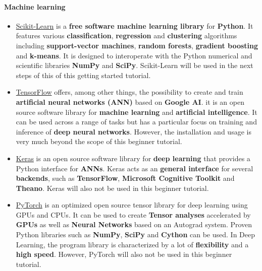 \documentclass [oneside,10pt,a4paper,ngerman,BCOR10mm,headsepline,parindent,final]{scrartcl}
\begin{document}
    \hypertarget{machine-learning}{%
\paragraph{Machine learning}\label{machine-learning}}

\begin{itemize}
\item
  \href{https://scikit-learn.org/stable/}{Scikit-Learn} is a
  \textbf{free software machine learning library} for \textbf{Python}.
  It features various \textbf{classification}, \textbf{regression} and
  \textbf{clustering} algorithms including \textbf{support-vector
  machines}, \textbf{random forests}, \textbf{gradient boosting} and
  \textbf{k-means}. It is designed to interoperate with the Python
  numerical and scientific libraries \textbf{NumPy} and \textbf{SciPy}.
  Scikit-Learn will be used in the next steps of this of this getting
  started tutorial.
\item
  \href{https://www.tensorflow.org}{TensorFlow} offers, among other
  things, the possibility to create and train \textbf{artificial neural
  networks (ANN)} based on \textbf{Google AI}. it is an open source
  software library for \textbf{machine learning} and \textbf{artificial
  intelligence}. It can be used across a range of tasks but has a
  particular focus on training and inference of \textbf{deep neural
  networks}. However, the installation and usage is very much beyond the
  scope of this beginner tutorial.
\item
  \href{https://keras.io/about/}{Keras} is an open source software
  library for \textbf{deep learning} that provides a Python interface
  for \textbf{ANNs}. Keras acts as an \textbf{general interface} for
  several \textbf{backends}, such as \textbf{TensorFlow},
  \textbf{Microsoft Cognitive Toolkit} and \textbf{Theano}. Keras will
  also not be used in this beginner tutorial.
\item
  \href{https://pytorch.org/docs/stable/index.html}{PyTorch} is an
  optimized open source tensor library for deep learning using GPUs and
  CPUs. It can be used to create \textbf{Tensor analyses} accelerated by
  \textbf{GPUs} as well as \textbf{Neural Networks} based on an Autograd
  system. Proven Python libraries such as \textbf{NumPy}, \textbf{SciPy}
  and \textbf{Cython} can be used. In Deep Learning, the program library
  is characterized by a lot of \textbf{flexibility} and a \textbf{high
  speed}. However, PyTorch will also not be used in this beginner
  tutorial.
\end{itemize}
\end{document}
